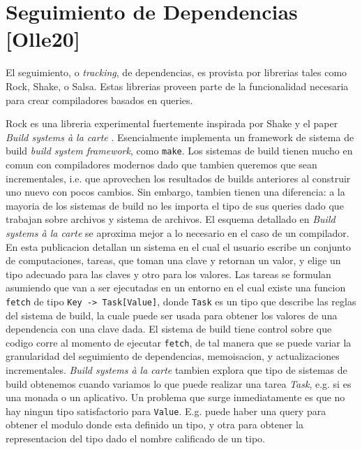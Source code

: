 \documentclass[12pt, a4paper]{report}
\begin{document}
\section*{Seguimiento de Dependencias [Olle20]}

El seguimiento, o \textit{tracking}, de dependencias, es provista por librerias tales como Rock, Shake, o Salsa.
Estas librerias proveen parte de la funcionalidad necesaria para crear compiladores basados en queries.

Rock es una libreria experimental fuertemente inspirada por Shake y el paper \textit{Build systems à la carte} \cite{mokhov2018build}.
Esencialmente implementa un framework de sistema de build \textit{build system framework}, como \texttt{make}.
Los sistemas de build tienen mucho en comun con compiladores modernos dado que tambien queremos que sean incrementales, i.e. que aprovechen los resultados de builds anteriores al construir uno nuevo con pocos cambios.
Sin embargo, tambien tienen una diferencia: a la mayoria de los sistemas de build no les importa el tipo de sus queries dado que trabajan sobre archivos y sistema de archivos.
El esquema detallado en \textit{Build systems à la carte} se aproxima mejor a lo necesario en el caso de un compilador.
En esta publicacion detallan un sistema en el cual el usuario escribe un conjunto de computaciones, tareas, que toman una clave y retornan un valor, y elige un tipo adecuado para las claves y otro para los valores.
Las tareas se formulan asumiendo que van a ser ejecutadas en un entorno en el cual existe una funcion \texttt{fetch} de tipo \texttt{Key -> Task[Value]}, donde \texttt{Task} es un tipo que describe las reglas del sistema de build, la cuale puede ser usada para obtener los valores de una dependencia con una clave dada.
El sistema de build tiene control sobre que codigo corre al momento de ejecutar \texttt{fetch}, de tal manera que se puede variar la granularidad del seguimiento de dependencias, memoisacion, y actualizaciones incrementales.
\textit{Build systems à la carte} tambien explora que tipo de sistemas de build obtenemos cuando variamos lo que puede realizar una tarea \textit{Task}, e.g. si es una monada o un aplicativo.
Un problema que surge inmediatamente es que no hay ningun tipo satisfactorio para \texttt{Value}.
E.g. puede haber una query para obtener el modulo donde esta definido un tipo, y otra para obtener la representacion del tipo dado el nombre calificado de un tipo.
\cite{olle_query_based}
\end{document}
